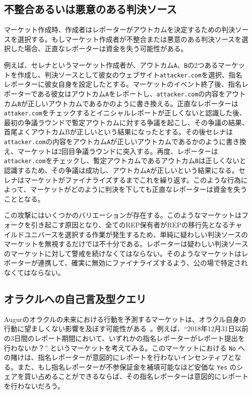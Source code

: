 \documentclass[floatfix,reprint,nofootinbib,amsmath,amssymb,epsfig,pre,floats,letterpaper,groupedaffiliation]{revtex4-1}
\theoremstyle{definition}
\theoremstyle{definition}
\theoremstyle{definition}
\begin{document}
\subsection{不整合あるいは悪意のある判決ソース}

マーケット作成時、作成者はレポーターがアウトカムを決定するための判決ソースを選択する。もしマーケット作成者が不整合または悪意のある判決ソースを選択した場合、正直なレポーターは資金を失う可能性がある。

例えば、セレナというマーケット作成者が、アウトカム\texttt{A}、\texttt{B}の2つあるマーケットを作成し、判決ソースとして彼女のウェブサイト\texttt{attacker.com}を選択、指名レポーターに彼女自身を設定したとする。マーケットのイベント終了後、指名レポーターである彼女はアウトカム\texttt{A}をレポートし、\texttt{attacker.com}の内容をアウトカム\texttt{B}が正しいアウトカムであるかのように書き換える。正直なレポーターは\texttt{attaker.com}をチェックするとイニシャルレポートが正しくないと認識した後、最初の争議ラウンドで暫定アウトカムに対する争議を起こし、その争議の結果、首尾よくアウトカムBが正しいという結果になったとする。その後セレナは\texttt{attacker.com}の内容をアウトカム\texttt{A}が正しいアウトカムであるかのように書き換え、マーケットは2回目争議ラウンドに突入する。再度、レポーターは\texttt{attacker.com}をチェックし、暫定アウトカムであるアウトカム\texttt{B}は正しくないと認識するため、その争議は成功し、アウトカム\texttt{A}が正しいという結果になる。セレナはマーケットがファイナライズするまでこれを繰り返す。このような行為によって、マーケットがどのように判決を下しても正直なレポーターは資金を失うこととなる。

この攻撃にはいくつかのバリエーションが存在する。このようなマーケットはフォークを引き起こす原因となり、全てのREP保有者がREPの移行先となるチャイルドユニバースを選択する作業が発生するため、単純に疑わしい判決ソースのマーケットを無視するだけでは不十分である。レポーターは疑わしい判決ソースのマーケットに対して警戒を続けなくてはならない。そのようなマーケットはレポーターが連携して、確実に無効にファイナライズするよう、公の場で特定されなくてはならない。

\subsection{オラクルへの自己言及型クエリ}

Augurのオラクルの未来における行動を予測するマーケットは、オラクル自身の行動に望ましくない影響を及ぼす可能性がある~\cite{Othman_2010}。例えば、``2018年12月31日以前の3日間のレポート期間において、いずれかの指名レポーターがレポート提出を行わないか？” というマーケットを考えてみる。このマーケットにおける \texttt{No} への賭けは、指名レポーターが意図的にレポートを行わないインセンティブとなる。また、もし指名レポーターが不参保証金を補填可能なほど安価な \texttt{Yes} のシェアを買い占めることができるならば、その指名レポーターは意図的にレポートを行わないだろう。
\end{document}
